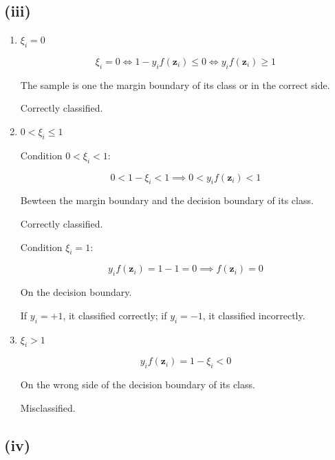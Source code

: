 \documentclass[11pt]{article}
\begin{document}
\subsection*{(iii)}

\begin{enumerate}
    \item[1. ] $\xi_i = 0$
    
    $$
    \xi_i = 0 \iff 1 - y_i f(\mathbf{z}_i) \le 0 \iff y_i f(\mathbf{z}_i) \ge 1
    $$

    The sample is one the margin boundary of its class or in the correct side.

    Correctly classified.

    \item[2. ] $0 < \xi_i \leq 1$
    
    Condition $0 < \xi_i < 1$:

    $$
    0 < 1 - \xi_i < 1 \implies 0 < y_i f(\mathbf{z}_i) < 1
    $$

    Bewteen the margin boundary and the decision boundary of its class.

    Correctly classified.

    Condition $\xi_i = 1$:

    $$
    y_i f(\mathbf{z}_i) = 1 - 1 = 0 \implies f(\mathbf{z}_i) = 0
    $$

    On the decision boundary.

    If $y_i = +1$, it classified correctly; if $y_i = -1$, it classified incorrectly.

    \item[3. ] $\xi_i > 1$
    
    $$
    y_i f(\mathbf{z}_i) = 1 - \xi_i < 0
    $$

    On the wrong side of the decision boundary of its class.

    Misclassified.
\end{enumerate}

\subsection*{(iv)}
\end{document}
